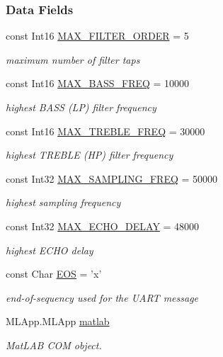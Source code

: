 \subsubsection*{Data Fields}
\begin{DoxyCompactItemize}
\item 
const Int16 \hyperlink{classuart__gui_1_1_soundlie___g_u_i_a30cbbba38c4151c2e85354e467fa956d}{M\-A\-X\-\_\-\-F\-I\-L\-T\-E\-R\-\_\-\-O\-R\-D\-E\-R} = 5
\begin{DoxyCompactList}\small\item\em maximum number of filter taps \end{DoxyCompactList}\item 
const Int16 \hyperlink{classuart__gui_1_1_soundlie___g_u_i_ac90d2c11617fac149686285a050a30b6}{M\-A\-X\-\_\-\-B\-A\-S\-S\-\_\-\-F\-R\-E\-Q} = 10000
\begin{DoxyCompactList}\small\item\em highest B\-A\-S\-S (L\-P) filter frequency \end{DoxyCompactList}\item 
const Int16 \hyperlink{classuart__gui_1_1_soundlie___g_u_i_aca72413113098188452107bf8f041b55}{M\-A\-X\-\_\-\-T\-R\-E\-B\-L\-E\-\_\-\-F\-R\-E\-Q} = 30000
\begin{DoxyCompactList}\small\item\em highest T\-R\-E\-B\-L\-E (H\-P) filter frequency \end{DoxyCompactList}\item 
const Int32 \hyperlink{classuart__gui_1_1_soundlie___g_u_i_a68f81db8e078a384454f91418d450e0f}{M\-A\-X\-\_\-\-S\-A\-M\-P\-L\-I\-N\-G\-\_\-\-F\-R\-E\-Q} = 50000
\begin{DoxyCompactList}\small\item\em highest sampling frequency \end{DoxyCompactList}\item 
const Int32 \hyperlink{classuart__gui_1_1_soundlie___g_u_i_a5ec140dda2bb623d2841d307ff8ee9bf}{M\-A\-X\-\_\-\-E\-C\-H\-O\-\_\-\-D\-E\-L\-A\-Y} = 48000
\begin{DoxyCompactList}\small\item\em highest E\-C\-H\-O delay \end{DoxyCompactList}\item 
const Char \hyperlink{classuart__gui_1_1_soundlie___g_u_i_a6d2c148b379977b23fc0b1c56ee7e1c3}{E\-O\-S} = 'x'
\begin{DoxyCompactList}\small\item\em end-\/of-\/sequency used for the U\-A\-R\-T message \end{DoxyCompactList}\item 
M\-L\-App.\-M\-L\-App \hyperlink{classuart__gui_1_1_soundlie___g_u_i_a3e31d22444514a602e98334ffd0db8a0}{matlab}
\begin{DoxyCompactList}\small\item\em Mat\-L\-A\-B C\-O\-M object. \end{DoxyCompactList}\end{DoxyCompactItemize}
